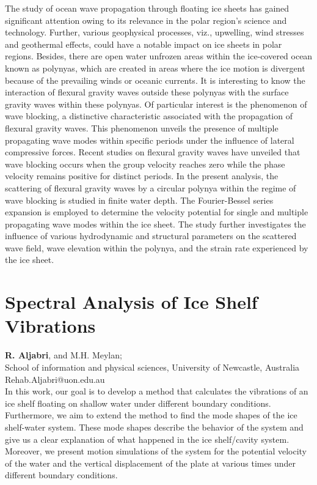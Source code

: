 \documentclass[9pt,a4paper,oneside]{book}
\numberwithin{equation}{section}
\begin{document}
The study of ocean wave propagation through floating ice sheets has gained significant attention
owing to its relevance in the polar region’s science and technology. Further, various geophysical
processes, viz., upwelling, wind stresses and geothermal effects, could have a notable impact on ice
sheets in polar regions. Besides, there are open water unfrozen areas within the ice-covered ocean
known as polynyas, which are created in areas where the ice motion is divergent because of the
prevailing winds or oceanic currents. It is interesting to know the interaction of flexural gravity waves
outside these polynyas with the surface gravity waves within these polynyas. Of particular interest
is the phenomenon of wave blocking, a distinctive characteristic associated with the propagation of
flexural gravity waves. This phenomenon unveils the presence of multiple propagating wave modes
within specific periods under the influence of lateral compressive forces. Recent studies on flexural
gravity waves have unveiled that wave blocking occurs when the group velocity reaches zero while
the phase velocity remains positive for distinct periods. In the present analysis, the scattering of
flexural gravity waves by a circular polynya within the regime of wave blocking is studied in finite
water depth. The Fourier-Bessel series expansion is employed to determine the velocity potential
for single and multiple propagating wave modes within the ice sheet. The study further investigates
the influence of various hydrodynamic and structural parameters on the scattered wave field, wave
elevation within the polynya, and the strain rate experienced by the ice sheet.

\section*{Spectral Analysis of Ice Shelf Vibrations}
 \label{abs:18}
  {\bf R. Aljabri},  and M.H. Meylan;\\
School of information and physical sciences, University of Newcastle, Australia\\
Rehab.Aljabri@uon.edu.au\\

In this work, our goal is to develop a method that calculates the vibrations of an ice shelf floating on shallow water under different boundary conditions. Furthermore, we aim to extend the method to find the mode shapes of the ice shelf-water system. These mode shapes describe the behavior of the system and give us a clear explanation of what happened in the ice shelf/cavity system. Moreover, we present motion simulations of the system for the potential velocity of the water and the vertical displacement of the plate at various times under different boundary conditions.
\end{document}
